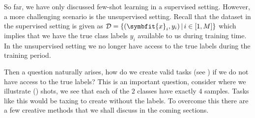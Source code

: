 So far, we have only discussed few-shot learning in a supervised setting. However, a more challenging scenario is the unsupervised setting. Recall that the dataset in the supervised setting is given as \(\mathcal{D} = \left\{(\symbfit{x}_i, y_i)\, |\, i \in [1,M]\right\}\) which implies that we have the true class labels $y_i$ available to us during training time. In the unsupervised setting we no longer have access to the true labels during the training period. 

Then a question naturally arises, how do we create valid tasks (see ) if we do not have access to the true labels? This is an important question, consider  where we illustrate () shots, we see that each of the $2$ classes have exactly $4$ samples. Tasks like this would be taxing to create without the labels. To overcome this there are a few creative methods that we shall discuss in the coming sections.

